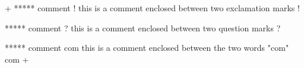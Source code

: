 



\gfexample+
   ***** comment ! this is a comment 
   enclosed between two exclamation marks !
   
   ***** comment ? this is a comment 
   enclosed between two question marks ?
   
   ***** comment com this is a comment 
   enclosed between the two words "com" com
+

